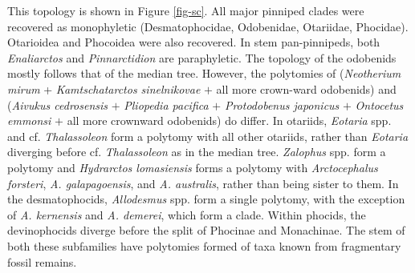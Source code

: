\documentclass[a4paper, 12pt]{article}
\begin{document}
This topology is shown in Figure \ref{fig-sc}. All major pinniped clades were recovered as monophyletic (Desmatophocidae, Odobenidae, Otariidae, Phocidae). Otarioidea and Phocoidea were also recovered. In stem pan-pinnipeds, both \textit{Enaliarctos} and \textit{Pinnarctidion} are paraphyletic. The topology of the odobenids mostly follows that of the median tree. However, the polytomies of (\textit{Neotherium mirum} + \textit{Kamtschatarctos sinelnikovae} $+$ all more crown-ward odobenids) and (\textit{Aivukus cedrosensis} $+$ \textit{Pliopedia pacifica} $+$ \textit{Protodobenus japonicus} $+$ \textit{Ontocetus emmonsi} $+$ all more crownward odobenids) do differ. In otariids, \textit{Eotaria} spp. and cf. \textit{Thalassoleon} form a polytomy with all other otariids, rather than \textit{Eotaria} diverging before cf. \textit{Thalassoleon} as in the median tree. \textit{Zalophus} spp. form a polytomy and \textit{Hydrarctos lomasiensis} forms a polytomy with \textit{Arctocephalus forsteri}, \textit{A. galapagoensis}, and \textit{A. australis}, rather than being sister to them. In the desmatophocids, \textit{Allodesmus} spp. form a single polytomy, with the exception of \textit{A. kernensis} and \textit{A. demerei}, which form a clade. Within phocids, the devinophocids diverge before the split of Phocinae and Monachinae. The stem of both these subfamilies have polytomies formed of taxa known from fragmentary fossil remains.
\end{document}
